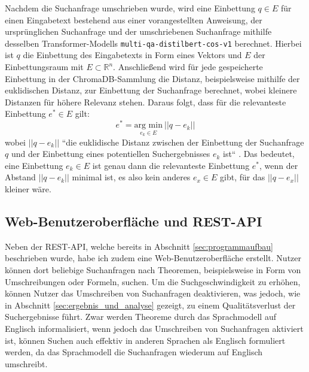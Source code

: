 \documentclass[12pt,letterpaper]{article} %
\begin{document}
Nachdem die Suchanfrage umschrieben wurde, wird eine Einbettung $q \in E$ für einen Eingabetext bestehend aus einer vorangestellten Anweisung, der ursprünglichen Suchanfrage und der umschriebenen Suchanfrage mithilfe desselben Transformer-Modells \texttt{multi-qa-distilbert-cos-v1} berechnet.
Hierbei ist $q$ die Einbettung des Eingabetexts in Form eines Vektors und $E$ der Einbettungsraum mit $E \subset \mathbb{R}^n$.
Anschließend wird für jede gespeicherte Einbettung in der ChromaDB-Sammlung die Distanz, beispielsweise mithilfe der euklidischen Distanz, zur Einbettung der Suchanfrage berechnet, wobei kleinere Distanzen für höhere Relevanz stehen.
Daraus folgt, dass für die relevanteste Einbettung $e^* \in E$ gilt:
$$e^* = \underset{e_k \in E}{\text{arg min}}\ ||q - e_k||$$
wobei $||q - e_k||$ ``die euklidische Distanz zwischen der Einbettung der Suchanfrage $q$ und der Einbettung eines potentiellen Suchergebnisses $e_k$ ist`` \citep[S. 2]{sheng_lprotector_2024}.
Das bedeutet, eine Einbettung $e_k \in E$ ist genau dann die relevanteste Einbettung $e^*$, wenn der Abstand $||q - e_k||$ minimal ist, es also kein anderes $e_x \in E$ gibt, für das $||q - e_x||$ kleiner wäre.


\hypertarget{rest_api}{
\subsection{Web-Benutzeroberfläche und REST-API}
}

Neben der REST-API, welche bereits in Abschnitt \ref{sec:programmaufbau} beschrieben wurde, habe ich zudem eine Web-Benutzeroberfläche erstellt.
Nutzer können dort beliebige Suchanfragen nach Theoremen, beispielsweise in Form von Umschreibungen oder Formeln, suchen.
Um die Suchgeschwindigkeit zu erhöhen, können Nutzer das Umschreiben von Suchanfragen deaktivieren, was jedoch, wie in Abschnitt \ref{sec:ergebnis_und_analyse} gezeigt, zu einem Qualitätsverlust der Suchergebnisse führt.
Zwar werden Theoreme durch das Sprachmodell auf Englisch informalisiert, wenn jedoch das Umschreiben von Suchanfragen aktiviert ist, können Suchen auch effektiv in anderen Sprachen als Englisch formuliert werden, da das Sprachmodell die Suchanfragen wiederum auf Englisch umschreibt.
\end{document}
